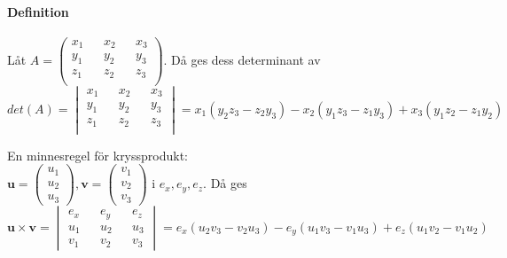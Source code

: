 \paragraph{Definition} Låt $A=\begin{pmatrix}
    x_{1} && x_{2} && x_{3}\\
    y_{1} && y_{2} && y_{3}\\
    z_{1} && z_{2} && z_{3}\\
\end{pmatrix}$.
Då ges dess determinant av $det(A)=\begin{vmatrix}
    x_{1} && x_{2} && x_{3}\\
    y_{1} && y_{2} && y_{3}\\
    z_{1} && z_{2} && z_{3}\\
\end{vmatrix}=x_{1}(y_{2}z_{3}-z_{2}y_{3})-x_{2}(y_{1}z_{3}-z_{1}y_{3})+x_{3}(y_{1}z_{2}-z_{1}y_{2})$

En minnesregel för kryssprodukt:\\
$\bm{u}=\begin{pmatrix}
    u_{1}\\u_{2}\\u_{3}
\end{pmatrix},
\bm{v}=\begin{pmatrix}
    v_{1}\\v_{2}\\v_{3}
\end{pmatrix}$
i $e_{x},e_{y},e_{z}$.
Då ges $\bm{u}\times \bm{v}=\begin{vmatrix}
    e_{x}&&e_{y}&&e_{z}\\
    u_{1}&&u_{2}&&u_{3}\\
    v_{1}&&v_{2}&&v_{3}
\end{vmatrix}=e_{x}(u_{2}v_{3}-v_{2}u_{3})-e_{y}(u_{1}v_{3}-v_{1}u_{3})+e_{z}(u_{1}v_{2}-v_{1}u_{2})$